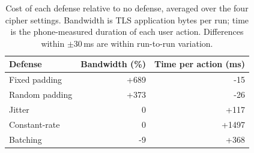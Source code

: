 \begin{table}[t]
\centering
\caption{Cost of each defense relative to no defense, averaged over the four cipher settings. Bandwidth is TLS application bytes per run; time is the phone-measured duration of each user action. Differences within $\pm$30\,ms are within run-to-run variation.}
\label{tab:overhead}
\begin{tabular}{lrr}
\toprule
Defense & Bandwidth (\%) & Time per action (ms) \\
\midrule
Fixed padding & +689 & -15 \\
Random padding & +373 & -26 \\
Jitter & 0 & +117 \\
Constant-rate & 0 & +1497 \\
Batching & -9 & +368 \\
\bottomrule
\end{tabular}
\end{table}
